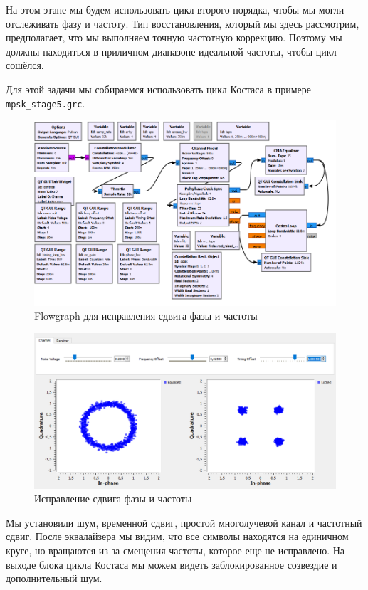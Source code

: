 \documentclass[a4paper, 14pt]{extarticle}
\begin{document}
    На этом этапе мы будем использовать цикл второго порядка, чтобы мы могли отслеживать фазу и частоту.
    Тип восстановления, который мы здесь рассмотрим, предполагает, что мы выполняем точную частотную коррекцию.
    Поэтому мы должны находиться в приличном диапазоне идеальной частоты, чтобы цикл сошёлся.

    Для этой задачи мы собираемся использовать цикл Костаса в примере \texttt{mpsk\_stage5.grc}.

    \begin{figure}[H]
        \centering
        \includegraphics[width=0.8\linewidth]{flowgraph_constas}
        \caption{Flowgraph для исправления сдвига фазы и частоты}
        \label{fig:flowgraph_constas}
    \end{figure}

    \begin{figure}[H]
        \centering
        \includegraphics[width=0.8\linewidth]{constas}
        \caption{Исправление сдвига фазы и частоты}
        \label{fig:constas}
    \end{figure}

    Мы установили шум, временной сдвиг, простой многолучевой канал и частотный сдвиг.
    После эквалайзера мы видим, что все символы находятся на единичном круге, но вращаются из-за смещения частоты, которое еще не исправлено.
    На выходе блока цикла Костаса мы можем видеть заблокированное созвездие и дополнительный шум.
\end{document}
